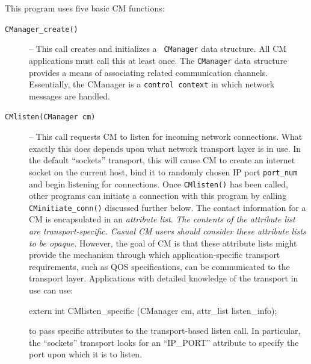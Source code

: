 \documentclass[11pt]{article}
\begin{document}
This program uses five basic CM functions:
\begin{description}
\item[{\tt CManager\_create()}] --  This call creates and initializes a {\tt
CManager} 
data structure.  All CM applications must call this at least once.
The {\tt CManager} data structure provides a means of associating related
communication channels.   Essentially, the CManager is a {\tt control
context} in which network messages are handled.
\item[{\tt CMlisten(CManager cm)}] -- This call requests CM to listen for
incoming network connections.  What exactly this does depends upon what
network transport layer is in use.  In the default ``sockets'' transport,
this will cause CM to create an internet socket on the current host, bind it
to randomly chosen IP port {\tt port\_num} and begin listening for
connections.  Once {\tt CMlisten()} has been called, other programs can
initiate a connection with this program by calling {\tt CMinitiate\_conn()}
discussed further below.   The contact information for a CM is encapsulated
in an {\it attribute list}.  {\it The contents of the attribute list are
transport-specific.  Casual CM users should consider these attribute lists
to be opaque.}  However, the goal of CM is that these attribute lists might
provide the mechanism through which application-specific transport
requirements, such as QOS specifications, can be communicated to the
transport layer.  Applications with detailed knowledge of the transport in
use can use:
\begin{verbatimtab}
	extern int CMlisten_specific (CManager cm, attr_list listen_info);
\end{verbatimtab}
to pass specific attributes to the transport-based listen call.  In
particular, the ``sockets'' transport looks for an ``IP\_PORT'' attribute to
specify the port upon which it is to listen.


\end{description}
\end{document}
